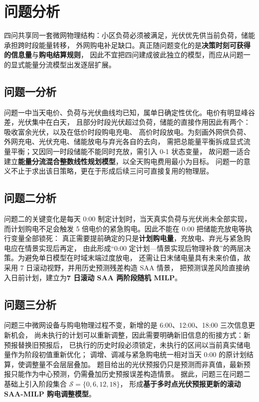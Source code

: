 \section{问题分析}

四问共享同一套微网物理结构：小区负荷必须被满足，光伏优先供当前负荷，储能承担跨时段能量转移，
外网购电补足缺口。真正随问题变化的是\textbf{决策时刻可获得的信息量}与\textbf{购电结算规则}，
因此不宜把四问建成彼此独立的模型，而应从问题一的显式能量分流模型出发逐层扩展。

\subsection{问题一分析}

问题一中当天电价、负荷与光伏曲线均已知，属单日确定性优化。电价有明显峰谷差，光伏集中在白天，
且部分时段光伏超过负荷，储能的直接作用因此有两个：吸收富余光伏，以及在低价时段购电充电、
高价时段放电。为刻画外网供负荷、外网充电、光伏充电、储能放电与弃光各自的去向，
需把总能量平衡拆成显式流量平衡；又因同一时段储能不能同时充放，需引入 0-1 状态变量，
故问题一适合建立\textbf{能量分流混合整数线性规划模型}，以全天购电费用最小为目标。
问题一的意义不止于求出该日策略，更在于形成后续三问可直接复用的物理层。

\subsection{问题二分析}

问题二的关键变化是每天 0:00 制定计划时，当天真实负荷与光伏尚未全部实现，
而计划购电不足会触发 5 倍电价的紧急购电。因此不能在 0:00 把储能充放电等执行变量全部锁死：
真正需要提前确定的只是\textbf{计划购电量}，充放电、弃光与紧急购电应在情景实现后再定，
由此形成“0:00 定计划—情景实现后物理补救”的两层决策。为避免单日模型在时域末端过度放电，
还需让日末储电量具有未来价值，故采用 7 日滚动视野，并用历史预测残差构造 SAA 情景，
把预测误差风险直接纳入日前计划，建立为\textbf{7 日滚动 SAA 两阶段随机 MILP}。

\subsection{问题三分析}

问题三中微网设备与购电物理过程不变，新增的是 6:00、12:00、18:00 三次信息更新机会，
尚未执行的计划可以重新调整，因此需要明确新旧信息的衔接方式：新预报替换旧预报后，
已执行的历史时段必须锁定，未执行的区间以当前真实储电量作为阶段初值重新优化；
调增、调减与紧急购电统一相对当天 0:00 的原计划结算，使调整量不会层层叠加。
题目给出的光伏预报仍只是预测而非真值，最新预报只能作为中心预测，仍需叠加历史预报误差构造情景。
据此，问题三在问题二基础上引入阶段集合 \(\mathcal S=\{0,6,12,18\}\)，
形成\textbf{基于多时点光伏预报更新的滚动 SAA-MILP 购电调整模型}。

